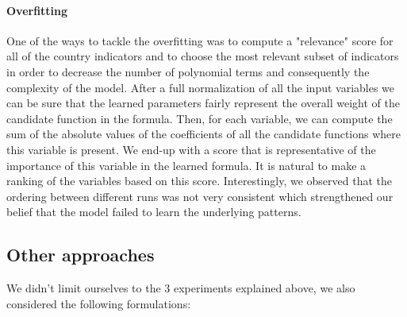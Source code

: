 \documentclass[12pt, letterpaper]{article}
\begin{document}
\paragraph{Overfitting}
One of the ways to tackle the overfitting was to compute a "relevance" score for all of the country indicators and to choose the most relevant subset of 
indicators in order to decrease the number of polynomial terms and consequently the complexity of the model. 
After a full normalization of all the input variables we can be sure that the learned parameters fairly represent the overall weight of the candidate function in the formula. 
Then, for each variable, we can compute the sum of the absolute values of the coefficients of all the candidate functions where this variable is present.
We end-up with a score that is representative of the importance of this variable in the learned formula. 
It is natural to make a ranking of the variables based on this score. 
Interestingly, we observed that the ordering between different runs was not very consistent which strengthened our belief that the model failed to learn the underlying patterns.


\subsection{Other approaches}

We didn't limit ourselves to the 3 experiments explained above, we also considered the following formulations:
\end{document}
